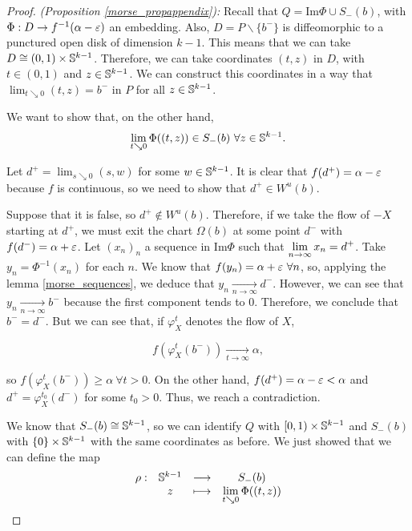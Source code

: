 \begin{proof}
{\it (Proposition \ref{morse_propappendix}):} Recall that $Q = \text{Im}\Phi \cup S_-(b)$, with $\Phi : D \rightarrow f^{-1}(\alpha-\varepsilon)$ an embedding. Also, $D = P \backslash \{b^-\}$ is diffeomorphic to a punctured open disk of dimension $k-1$. This means that we can take $D \cong (0,1) \times \mathbb{S}^{k-1}$. Therefore, we can take coordinates $(t,z)$ in $D$, with $t \in (0,1)$ and $z \in \mathbb{S}^{k-1}$. We can construct this coordinates in a way that $\displaystyle\lim_{t \searrow 0} (t,z) = b^-$ in $P$ for all $z \in \mathbb{S}^{k-1}$.

We want to show that, on the other hand,
$$\displaystyle\lim_{t \searrow 0} \Phi((t,z)) \in S_-(b) \ \forall z \in \mathbb{S}^{k-1}. $$

Let $d^+ = \displaystyle\lim_{s \searrow 0} (s,w)$ for some $w \in \mathbb{S}^{k-1}$. It is clear that $f(d^+) = \alpha - \varepsilon$ because $f$ is continuous, so we need to show that $d^+ \in W^u(b)$.

Suppose that it is false, so $d^+ \notin W^u(b)$. Therefore, if we take the flow of $- X$ starting at $d^+$, we must exit the chart $\Omega(b)$ at some point $d^-$ with $f(d^-) = \alpha + \varepsilon$. Let $(x_n)_n$ a sequence in $\text{Im}\Phi$ such that $\displaystyle\lim_{n \rightarrow \infty} x_n = d^+$. Take $y_n = \Phi^{-1}(x_n)$ for each $n$. We know that $f(y_n) = \alpha + \varepsilon \ \forall n$, so, applying the lemma \ref{morse_sequences}, we deduce that $y_n \xrightarrow[n \rightarrow \infty]{} d^-$. However, we can see that $y_n \xrightarrow[n \rightarrow \infty]{} b^-$ because the first component tends to $0$. Therefore, we conclude that $b^- = d^-$. But we can see that, if $\varphi_X^t$ denotes the flow of $X$,

$$f(\varphi_X^t(b^-)) \xrightarrow[t \rightarrow \infty]{} \alpha ,$$

so $f(\varphi_X^t(b^-)) \geq \alpha \ \forall t > 0$. On the other hand, $f(d^+) = \alpha - \varepsilon < \alpha$ and $d^+ = \varphi_X^{t_0}(d^-)$ for some $t_0 > 0$. Thus, we reach a contradiction.

We know that $S_-(b) \cong \mathbb{S}^{k-1}$, so we can identify $Q$ with $[0,1) \times \mathbb{S}^{k-1}$ and $S_-(b)$ with $\{0\} \times \mathbb{S}^{k-1}$ with the same coordinates as before. We just showed that we can define the map
$$\begin{array}{rccc}\rho : & \mathbb{S}^{k-1} & \longrightarrow & S_-(b) \\ & z & \longmapsto & \displaystyle\lim_{t \searrow 0} \Phi((t,z)) \end{array}$$


\end{proof}
